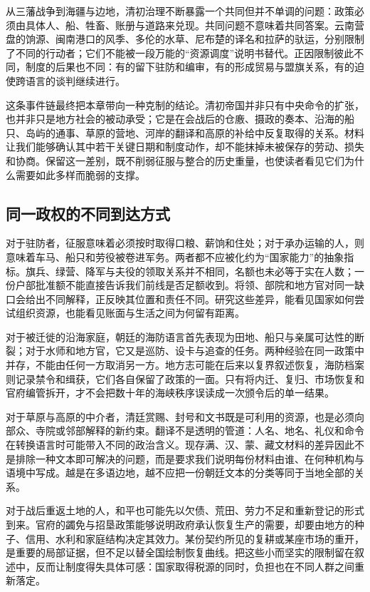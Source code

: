 从三藩战争到海疆与边地，清初治理不断暴露一个共同但并不单调的问题：政策必须由具体人、船、牲畜、账册与道路来兑现。共同问题不意味着共同答案。云南营盘的饷源、闽南港口的风季、多伦的水草、尼布楚的译名和拉萨的驮运，分别限制了不同的行动者；它们不能被一段万能的“资源调度”说明书替代。正因限制彼此不同，制度的后果也不同：有的留下驻防和编审，有的形成贸易与盟旗关系，有的迫使跨语言的谈判继续进行。

这条事件链最终把本章带向一种克制的结论。清初帝国并非只有中央命令的扩张，也并非只是地方社会的被动承受；它是在会战后的仓廒、摄政的奏本、沿海的船只、岛屿的通事、草原的营地、河岸的翻译和高原的补给中反复取得的关系。材料让我们能够确认其中若干关键日期和制度动作，却不能抹掉未被保存的劳动、损失和协商。保留这一差别，既不削弱征服与整合的历史重量，也使读者看见它们为什么需要如此多样而脆弱的支撑。


\subsection*{同一政权的不同到达方式}

对于驻防者，征服意味着必须按时取得口粮、薪饷和住处；对于承办运输的人，则意味着车马、船只和劳役被卷进军务。两者都不应被化约为“国家能力”的抽象指标。旗兵、绿营、降军与夫役的领取关系并不相同，名额也未必等于实在人数；一份户部批准额不能直接告诉我们前线是否足额收到。将领、部院和地方官对同一缺口会给出不同解释，正反映其位置和责任不同。研究这些差异，能看见国家如何尝试组织资源，也能看见账面与生活之间为何留有距离。

对于被迁徙的沿海家庭，朝廷的海防语言首先表现为田地、船只与亲属可达性的断裂；对于水师和地方官，它又是巡防、设卡与追查的任务。两种经验在同一政策中并存，不能由任何一方取消另一方。地方志可能在后来以复界叙述恢复，海防档案则记录禁令和缉获，它们各自保留了政策的一面。只有将内迁、复归、市场恢复和官府编管拆开，才不会把数十年的海峡秩序误读成一次颁令后的单一结果。

对于草原与高原的中介者，清廷赏赐、封号和文书既是可利用的资源，也是必须向部众、寺院或邻部解释的新约束。翻译不是透明的管道：人名、地名、礼仪和命令在转换语言时可能带入不同的政治含义。现存满、汉、蒙、藏文材料的差异因此不是排除一种文本即可解决的问题，而是要求我们说明每份材料由谁、在何种机构与语境中写成。越是在多语边地，越不应把一份朝廷文本的分类等同于当地全部的关系。

对于战后重返土地的人，和平也可能先以欠债、荒田、劳力不足和重新登记的形式到来。官府的蠲免与招垦政策能够说明政府承认恢复生产的需要，却要由地方的种子、信用、水利和家庭结构决定其效力。某份契约所见的复耕或某座市场的重开，是重要的局部证据，但不足以替全国绘制恢复曲线。把这些小而坚实的限制留在叙述中，反而让制度得失具体可感：国家取得税源的同时，负担也在不同人群之间重新落定。

